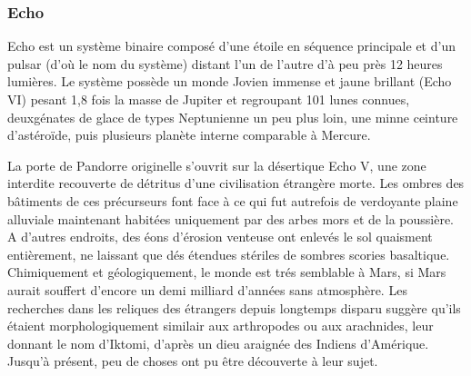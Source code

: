                                                                      \subsubsection{Echo} \label{sec:echo} 

                                                                     Echo est un système binaire composé d'une étoile en séquence principale et d'un pulsar (d'où le nom du système) distant l'un de l'autre d'à peu près 12 heures lumières. Le système possède un monde Jovien immense et jaune brillant (Echo VI) pesant 1,8 fois la masse de Jupiter et regroupant 101 lunes connues, deuxgénates de glace de types Neptunienne un peu plus loin, une minne ceinture d'astéroïde, puis plusieurs planète interne comparable à Mercure. 





                                                                     La porte de Pandorre originelle s'ouvrit sur la désertique Echo V, une zone interdite recouverte de détritus d'une civilisation étrangère morte. Les ombres des bâtiments de ces précurseurs font face à ce qui fut autrefois de verdoyante plaine alluviale maintenant habitées uniquement par des arbes mors et de la poussière. A d'autres endroits, des éons d'érosion venteuse ont enlevés le sol quaisment entièrement, ne laissant que dés étendues stériles de sombres scories basaltique. Chimiquement et géologiquement, le monde est trés semblable à Mars, si Mars aurait souffert d'encore un demi milliard d'années sans atmosphère. Les recherches dans les reliques des étrangers depuis longtemps disparu suggère qu'ils étaient morphologiquement similair aux arthropodes ou aux arachnides, leur donnant le nom d'Iktomi, d'après un dieu araignée des Indiens d'Amérique. Jusqu'à présent, peu de choses ont pu être découverte à leur sujet. 

